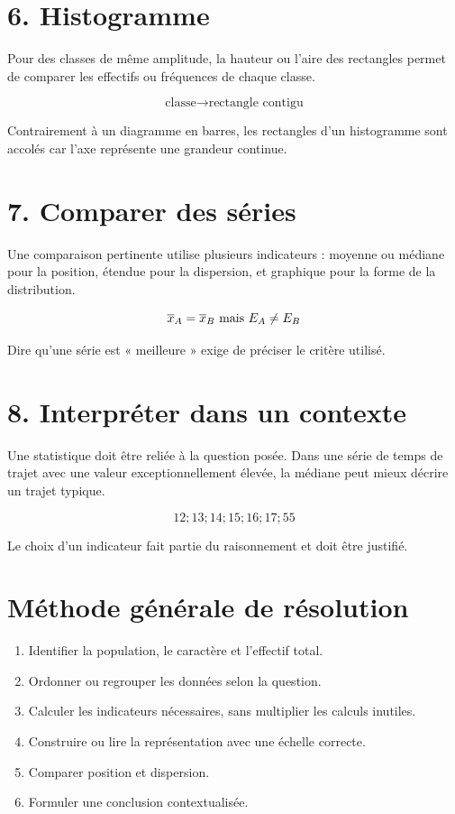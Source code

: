 \section{6. Histogramme}
Pour des classes de même amplitude, la hauteur ou l’aire des rectangles permet de comparer les effectifs ou fréquences de chaque classe.

\[
\text{classe}\rightarrow\text{rectangle contigu}
\]

\begin{exemple}
Contrairement à un diagramme en barres, les rectangles d’un histogramme sont accolés car l’axe représente une grandeur continue.
\end{exemple}

\section{7. Comparer des séries}
Une comparaison pertinente utilise plusieurs indicateurs : moyenne ou médiane pour la position, étendue pour la dispersion, et graphique pour la forme de la distribution.

\[
\overline x_A=\overline x_B$ mais $E_A\neq E_B
\]

\begin{exemple}
Dire qu’une série est « meilleure » exige de préciser le critère utilisé.
\end{exemple}

\section{8. Interpréter dans un contexte}
Une statistique doit être reliée à la question posée. Dans une série de temps de trajet avec une valeur exceptionnellement élevée, la médiane peut mieux décrire un trajet typique.

\[
12;13;14;15;16;17;55
\]

\begin{exemple}
Le choix d’un indicateur fait partie du raisonnement et doit être justifié.
\end{exemple}

\section{Méthode générale de résolution}
\begin{methode}
\begin{enumerate}
\item Identifier la population, le caractère et l’effectif total.
\item Ordonner ou regrouper les données selon la question.
\item Calculer les indicateurs nécessaires, sans multiplier les calculs inutiles.
\item Construire ou lire la représentation avec une échelle correcte.
\item Comparer position et dispersion.
\item Formuler une conclusion contextualisée.
\end{enumerate}
\end{methode}

